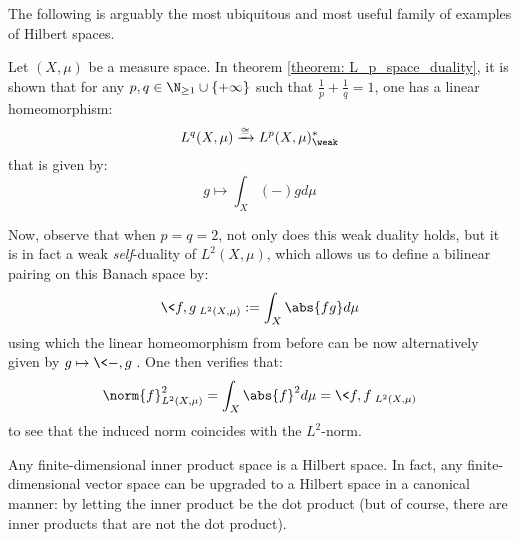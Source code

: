         The following is arguably the most ubiquitous and most useful family of examples of Hilbert spaces.  
        \begin{example}[$L^2$-spaces] \label{example: L_2_spaces_as_hilbert_spaces}
            Let $(X, \mu)$ be a measure space. In theorem \ref{theorem: L_p_space_duality}, it is shown that for any $p, q \in \N_{\geq 1} \cup \{+\infty\}$ such that $\frac1p + \frac1q = 1$, one has a linear homeomorphism:
                $$L^q(X, \mu) \xrightarrow[]{\cong} L^p(X, \mu)^*_{\weak}$$
            that is given by:
                $$g \mapsto \int_X (-) g d\mu$$

            Now, observe that when $p = q = 2$, not only does this weak duality holds, but it is in fact a weak \textit{self}-duality of $L^2(X, \mu)$, which allows us to define a bilinear pairing on this Banach space by:
                $$\<f, g\>_{L^2(X, \mu)} := \int_X \abs{ fg } d\mu$$
            using which the linear homeomorphism from before can be now alternatively given by $g \mapsto \<-, g\>$. One then verifies that:
                $$\norm{f}_{L^2(X, \mu)}^2 = \int_X \abs{f}^2 d\mu = \<f, f\>_{L^2(X, \mu)}$$
            to see that the induced norm coincides with the $L^2$-norm.
        \end{example}
        \begin{example}
            Any finite-dimensional inner product space is a Hilbert space. In fact, any finite-dimensional vector space can be upgraded to a Hilbert space in a canonical manner: by letting the inner product be the dot product (but of course, there are inner products that are not the dot product).
        \end{example}


